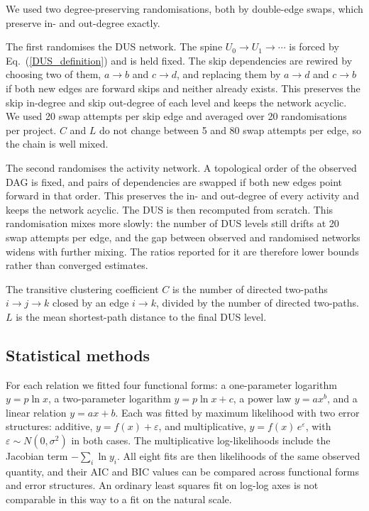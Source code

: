 \documentclass[11pt,a4paper]{article}
\begin{document}
We used two degree-preserving randomisations, both by double-edge swaps, which
preserve in- and out-degree exactly.

The first randomises the DUS network. The spine $U_0 \to U_1 \to \cdots$
is forced by Eq.~(\ref{DUS_definition}) and is held fixed. The skip
dependencies are rewired by choosing two of them, $a \to b$ and
$c \to d$, and replacing them by $a \to d$ and $c \to b$ if both new edges
are forward skips and neither already exists. This preserves the skip
in-degree and skip out-degree of each level and keeps the network acyclic. We
used 20 swap attempts per skip edge and averaged over 20 randomisations per
project. $C$ and $L$ do not change between 5 and 80 swap attempts per edge,
so the chain is well mixed.

The second randomises the activity network. A topological order of the observed
DAG is fixed, and pairs of dependencies are swapped if both new edges point
forward in that order. This preserves the in- and out-degree of every activity
and keeps the network acyclic. The DUS is then recomputed from scratch. This
randomisation mixes more slowly: the number of DUS levels still drifts at 20
swap attempts per edge, and the gap between observed and randomised networks
widens with further mixing. The ratios reported for it are therefore lower
bounds rather than converged estimates.

The transitive clustering coefficient $C$ is the number of directed two-paths
$i \to j \to k$ closed by an edge $i \to k$, divided by the number of directed
two-paths. $L$ is the mean shortest-path distance to the final DUS level.

\subsection*{Statistical methods}

For each relation we fitted four functional forms: a one-parameter logarithm $y = p\ln x$, a two-parameter logarithm $y = p\ln x + c$, a power law $y = a x^{b}$, and a linear relation $y = ax + b$. Each was fitted by maximum likelihood with two error structures: additive, $y = f(x) + \varepsilon$, and multiplicative, $y = f(x)\,e^{\varepsilon}$, with $\varepsilon \sim N(0,\sigma^2)$ in both cases. The multiplicative log-likelihoods include the Jacobian term $-\sum_i \ln y_i$. All eight fits are then likelihoods of the same observed quantity, and their AIC and BIC values can be compared across functional forms and error structures. An ordinary least squares fit on log-log axes is not comparable in this way to a fit on the natural scale.
\end{document}
